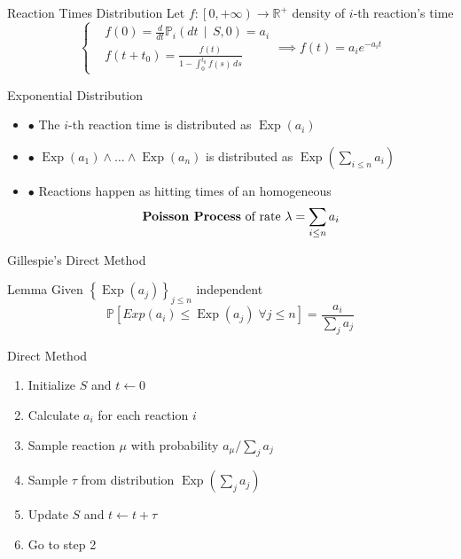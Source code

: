 \documentclass{beamer}
\DeclareMathOperator{\Exp}{\text{Exp}}
\begin{document}
\begin{frame}{Reaction Times Distribution}
  Let $f:\left[0, +\infty\right) \longrightarrow \mathbb{R}^+$ density of $i$-th reaction's time 
  \begin{equation*}
    \left\{
    \begin{aligned}
      &f(0) = \frac{d}{dt} \mathbb{P}_i \left(dt \, \middle| \, S, 0 \right)= a_i\\
      &f(t + t_0) = \frac{f(t)}{1 - \int_0^{t_0} f(s)\, ds}         
    \end{aligned}\right.
    \implies f(t) =  a_i e^{-a_i t}
  \end{equation*}
  \begin{block}{Exponential Distribution}
    \begin{itemize}
    \item $\bullet$ The $i$-th reaction time is distributed as $\Exp(a_i)$
    \item $\bullet$ $\Exp(a_1) \land \dots \land \Exp(a_n)$ is distributed as
      $\Exp\left(\sum_{i\leq n} a_i\right)$ 
    \item $\bullet$ Reactions happen as hitting times of an homogeneous 
      $$\text{\textbf{Poisson Process} of rate } \lambda =  \sum_{i\leq n} a_i$$ 
    \end{itemize}
  \end{block}
\end{frame}

\begin{frame}{Gillespie's Direct Method}
  \begin{block}{Lemma}
    Given $\left\{\Exp(a_j)\right\}_{j\leq n}$ independent 
    \begin{equation*}
      \mathbb{P}\left[Exp(a_i) \leq \Exp(a_j) \; \forall j \leq n \right] = \frac{a_i}{\sum_ja_j}
    \end{equation*}
  \end{block}
  \begin{block}{Direct Method}
    \begin{enumerate}
    \item Initialize $S$ and $t\leftarrow 0$ 
    \item Calculate $a_i$ for each reaction $i$
    \item Sample reaction $\mu$ with probability $a_\mu \big/ \sum_j a_j$
    \item Sample $\tau$ from distribution $\Exp\left(\sum_j a_j\right)$
    \item Update $S$ and $t \leftarrow t + \tau$
    \item Go to step 2
    \end{enumerate}
  \end{block}
\end{frame}
\end{document}
